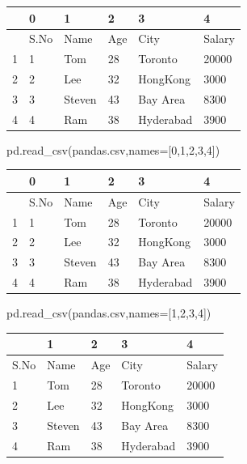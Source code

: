\documentclass[
  a4paper,
  DIV=11,
  numbers=noendperiod]{scrreprt}
\newenvironment{Shaded}{\begin{snugshade}}{\end{snugshade}}
\newcommand{\DecValTok}[1]{\textcolor[rgb]{0.68,0.00,0.00}{#1}}
\newcommand{\NormalTok}[1]{\textcolor[rgb]{0.00,0.23,0.31}{#1}}
\newcommand{\OperatorTok}[1]{\textcolor[rgb]{0.37,0.37,0.37}{#1}}
\newcommand{\StringTok}[1]{\textcolor[rgb]{0.13,0.47,0.30}{#1}}
\begin{document}
\begin{longtable}[]{@{}llllll@{}}
\toprule\noalign{}
& 0 & 1 & 2 & 3 & 4 \\
\midrule\noalign{}
\endhead
\bottomrule\noalign{}
\endlastfoot
0 & S.No & Name & Age & City & Salary \\
1 & 1 & Tom & 28 & Toronto & 20000 \\
2 & 2 & Lee & 32 & HongKong & 3000 \\
3 & 3 & Steven & 43 & Bay Area & 8300 \\
4 & 4 & Ram & 38 & Hyderabad & 3900 \\
\end{longtable}

\begin{Shaded}
\begin{Highlighting}[]
\NormalTok{pd.read\_csv(}\StringTok{\textquotesingle{}pandas.csv\textquotesingle{}}\NormalTok{,names}\OperatorTok{=}\NormalTok{[}\DecValTok{0}\NormalTok{,}\DecValTok{1}\NormalTok{,}\DecValTok{2}\NormalTok{,}\DecValTok{3}\NormalTok{,}\DecValTok{4}\NormalTok{])}
\end{Highlighting}
\end{Shaded}

\begin{longtable}[]{@{}llllll@{}}
\toprule\noalign{}
& 0 & 1 & 2 & 3 & 4 \\
\midrule\noalign{}
\endhead
\bottomrule\noalign{}
\endlastfoot
0 & S.No & Name & Age & City & Salary \\
1 & 1 & Tom & 28 & Toronto & 20000 \\
2 & 2 & Lee & 32 & HongKong & 3000 \\
3 & 3 & Steven & 43 & Bay Area & 8300 \\
4 & 4 & Ram & 38 & Hyderabad & 3900 \\
\end{longtable}

\begin{Shaded}
\begin{Highlighting}[]
\NormalTok{pd.read\_csv(}\StringTok{\textquotesingle{}pandas.csv\textquotesingle{}}\NormalTok{,names}\OperatorTok{=}\NormalTok{[}\DecValTok{1}\NormalTok{,}\DecValTok{2}\NormalTok{,}\DecValTok{3}\NormalTok{,}\DecValTok{4}\NormalTok{])}
\end{Highlighting}
\end{Shaded}

\begin{longtable}[]{@{}lllll@{}}
\toprule\noalign{}
& 1 & 2 & 3 & 4 \\
\midrule\noalign{}
\endhead
\bottomrule\noalign{}
\endlastfoot
S.No & Name & Age & City & Salary \\
1 & Tom & 28 & Toronto & 20000 \\
2 & Lee & 32 & HongKong & 3000 \\
3 & Steven & 43 & Bay Area & 8300 \\
4 & Ram & 38 & Hyderabad & 3900 \\
\end{longtable}
\end{document}
